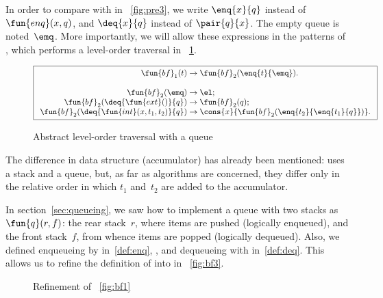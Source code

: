 In order to compare with
 in
\fig~\vref{fig:pre3}, we write
\(\enq{x}{q}\) instead of
\(\fun{enq}(x,q)\), and
\(\deq{x}{q}\) instead of \(\pair{q}{x}\). The
empty queue is noted~\(\emq\). More importantly,
we will allow these expressions in the patterns of
, which performs a
level\hyp{}order traversal in \fig~\ref{fig:bf1}.
\begin{figure}
\begin{equation*}
\boxed{
\begin{array}{r@{\;}c@{\;}l}
\fun{bf}_1(t) & \rightarrow & \fun{bf}_2(\enq{t}{\emq}).\\
\\
\fun{bf}_2(\emq) & \rightarrow & \el;\\
\fun{bf}_2(\deq{\fun{ext}()}{q}) & \rightarrow & \fun{bf}_2(q);\\
\fun{bf}_2(\deq{\fun{int}(x,t_1,t_2)}{q})
  & \rightarrow & \cons{x}{\fun{bf}_2(\enq{t_2}{\enq{t_1}{q}})}.
\end{array}}
\end{equation*}
\caption{Abstract level-order traversal with a queue}
\label{fig:bf1}
\end{figure}
The difference in data structure (accumulator) has already been
mentioned:  uses a
stack and  a queue, but,
as far as algorithms are concerned, they differ only in the relative
order in which \(t_1\) and~\(t_2\) are added to the accumulator.

In section~\ref{sec:queueing}, we saw how to implement a queue with
two stacks as \(\fun{q}(r,f)\): the rear
stack~\(r\), where items are pushed (logically enqueued), and the
front stack~\(f\), from whence items are popped (logically
dequeued). Also, we defined enqueueing by
 in~\eqref{def:enq},
, and dequeueing with
 in~\eqref{def:deq}. This allows us
to refine the definition of
 into
 in \fig~\vref{fig:bf3}.
\begin{figure}
\abovedisplayskip=0pt
\belowdisplayskip=0pt
\centering
{}
\caption{Refinement of \fig~\vref{fig:bf1}}
\label{fig:bf3}
\end{figure}

